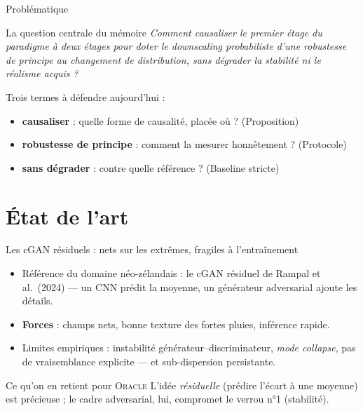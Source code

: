 \documentclass[aspectratio=169,10pt]{beamer}
\newcommand{\Oracle}{\textsc{Oracle}}
\newcommand{\tgood}[1]{\textcolor{green!40!black}{\textbf{#1}}}
\newcommand{\tbad}[1]{\textcolor{uriaccent}{#1}}
\begin{document}
\begin{frame}{Problématique}
  \vspace{0.4cm}
  \begin{block}{La question centrale du mémoire}
    \centering
    \emph{Comment \alert{causaliser le premier étage} du paradigme à deux étages
    pour doter le downscaling probabiliste d'une \alert{robustesse de principe}
    au changement de distribution, \alert{sans dégrader} la stabilité ni le
    réalisme acquis ?}
  \end{block}
  \vspace{0.35cm}
  \small Trois termes à défendre aujourd'hui :
  \begin{itemize}
    \item \textbf{causaliser} : quelle forme de causalité, placée où ? (Proposition)
    \item \textbf{robustesse de principe} : comment la mesurer honnêtement ? (Protocole)
    \item \textbf{sans dégrader} : contre quelle référence ? (Baseline stricte)
  \end{itemize}
\end{frame}

\section{État de l'art}

\begin{frame}{Les cGAN résiduels : nets sur les extrêmes, fragiles à l'entraînement}
  \begin{itemize}
    \item Référence du domaine néo-zélandais : le cGAN résiduel de Rampal et al.\ (2024) ---
          un CNN prédit la moyenne, un générateur adversarial ajoute les détails.
    \item \tgood{Forces} : champs nets, bonne texture des fortes pluies, inférence rapide.
    \item \tbad{Limites empiriques} : instabilité générateur--discriminateur,
          \emph{mode collapse}, pas de vraisemblance explicite --- et sub-dispersion
          persistante.
  \end{itemize}
  \vspace{0.2cm}
  \begin{block}{Ce qu'on en retient pour \Oracle{}}
    \small L'idée \emph{résiduelle} (prédire l'écart à une moyenne) est précieuse ;
    le cadre adversarial, lui, compromet le verrou n°1 (stabilité).
  \end{block}
\end{frame}
\end{document}
